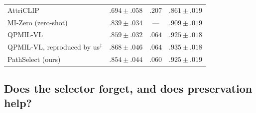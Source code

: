 \documentclass{article}
\newif\ifmarkup \markuptrue
\newcommand{\repc}[3]{\ifmarkup\textcolor{gray}{\sout{#2}}\textcolor{#1}{#3}\else#3\fi}
\newcommand{\repP}[2]{\repc{violet}{#1}{#2}}  %
\newcommand{\repB}[2]{\repc{brown}{#1}{#2}}   %
\begin{document}
\begin{table}[!t]
\begin{tabular}{lccc}
AttriCLIP \cite{wang2023attriclip} & $.694{\pm}.058$ & $.207$ & $.861{\pm}.019$ \\
MI-Zero \cite{lu2023mizero} (zero-shot) & $.839{\pm}.034$ & --- & $.909{\pm}.019$ \\
QPMIL-VL \cite{gou2025qpmil} & $.859{\pm}.032$ & $.064$ & $.925{\pm}.018$ \\
\midrule
QPMIL-VL, reproduced by us$^\ddagger$ & $.868{\pm}.046$ & $.064$ & $.935{\pm}.018$ \\
\midrule
PathSelect (ours) & $.854{\pm}.044$ & $.060$ & $.925{\pm}.019$ \\
\bottomrule
\end{tabular}
\end{table}

\subsection{Does the selector forget, and does preservation help?}
\label{ssec:ablation}

\begin{table}[!htb]
\centering\footnotesize\renewcommand{\arraystretch}{0.92}
\setlength{\tabcolsep}{4pt}
\caption{\textbf{Leave-out chain in both task orders} \protect\repP{(ConSlide benchmark, ten-fold CV; ACC mean$\pm$sd, forgetting mean)}{(TCGA continual WSI benchmark, ten-fold CV; ACC mean$\pm$sd, forgetting mean)}. Reverse = ESCA$\rightarrow$RCC$\rightarrow$BRCA$\rightarrow$LUNG; forward = the opposite. The zero-shot reference selects the eight patches with the highest class-text cosine, pools them uniformly, and uses the frozen head; \protect\repB{it learns nothing and therefore cannot forget.}{it learns nothing.} Last two rows: the strongest published method, as reported in \cite{gou2025qpmil} and as rerun by us with its released code.}
\label{tab:chain}
\end{table}
\end{document}
